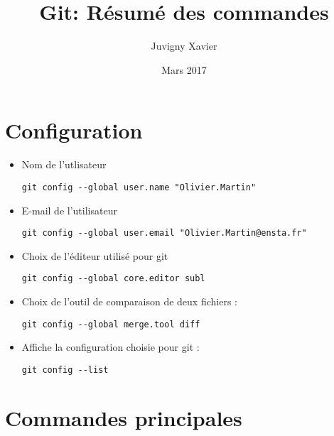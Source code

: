 \documentclass[fleqn,11pt]{article}
\title{Git: Résumé des commandes}
\author{Juvigny Xavier}
\date{Mars 2017}
\begin{document}
\maketitle

\section{Configuration}

\begin{itemize}
\item Nom de l'utlisateur 
\begin{lstlisting}
git config --global user.name "Olivier.Martin"
\end{lstlisting}
\item E-mail de l'utilisateur
\begin{lstlisting}
git config --global user.email "Olivier.Martin@ensta.fr"
\end{lstlisting}
\item Choix de l'éditeur utilisé pour git
\begin{lstlisting}
git config --global core.editor subl
\end{lstlisting}
\item Choix de l'outil de comparaison de deux fichiers :
\begin{lstlisting}
git config --global merge.tool diff
\end{lstlisting}
\item Affiche la configuration choisie pour git :
\begin{lstlisting}
git config --list
\end{lstlisting}
\end{itemize}

\section{Commandes principales}
\end{document}
